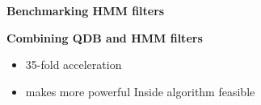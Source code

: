 \documentclass[landscape]{slides}
\begin{document}
\begin{slide}
\large
\begin{center}
\textbf{Benchmarking HMM filters}
\end{center}


\vfill

\end{slide}
\begin{slide}
\large
\begin{center}
\normalsize
\textbf{Combining QDB and HMM filters}

\small
\begin{itemize}
\item 35-fold acceleration
\item makes more powerful Inside algorithm feasible
\end{itemize}

\end{center}


\vfill

\end{slide}
\end{document}
